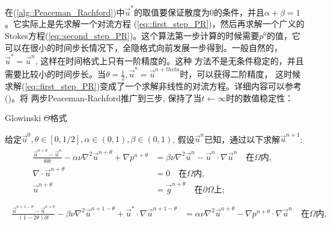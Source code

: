          在(\ref{alg::Peaceman_Rachford})中$\vec{u}^*$的取值要保证散度为0的条件，并且$\alpha + \beta = 1$。它实际上是先求解一个对流方程
         (\ref{eq::first_step_PR})，然后再求解一个广义的Stokes方程(\ref{eq::second_step_PR})。这个算法第一步计算的时候需要$p^0$的值，它
         可以在很小的时间步长情况下，全隐格式向前发展一步得到。一般自然的，$\vec{u}^* = \vec{u}^n$, 这样在时间格式上只有一阶精度的。这种
         方法不是无条件稳定的，并且需要比较小的时间步长。当$\theta = \frac{1}{2}, \vec{u}^* = \vec{u}^{n + theta}$时，可以获得二阶精度，
         这时候求解(\ref{eq::first_step_PR})变成了一个求解非线性的对流方程。详细内容可以参考(\cite{silvester1996fast})。\cite{dean1993some}将
         两步Peaceman-Rachford推广到三步, 保持了当$t \leftarrow \infty$时的数值稳定性：
         \begin{algorithm}
             \caption{Glowinski $\Theta$格式}
            \begin{algorithmic}[1]
                给定$\vec{u}^0, \theta \in [0, 1/2], \alpha \in (0, 1), \beta \in (0, 1)$, 假设$\vec{u}^n$已知，通过以下求解$\vec{u}^{n + 1}$:
                \begin{eqnarray}
                    \begin{aligned}
                        \frac{\vec{u}^{n + \theta} - \vec{u}^n}{\theta \delta t} - \alpha \nu \nabla^2\vec{u}^{n + \theta} +
                        \nabla p^{n + \theta}
                        & = \beta \nu \nabla^2\vec{u}^n - \vec{u}^n \cdot \nabla\vec{u}^{n} \quad \mbox {在} \Omega \mbox{内},& \\
                        \nabla \cdot \vec{u}^{n + \theta} & =  0 \quad \mbox{在} \Omega \mbox{内},&\\
                        \vec{u}^{n + \theta} & = \vec{g}^{n + \theta} \quad \mbox{在} \partial \Omega \mbox{上};& \\
                    \end{aligned}
                    \label{eq::first_step_GL_theta}
                \end{eqnarray}
                \begin{eqnarray}
                    \begin{aligned}
                        \frac{\vec{u}^{n + 1 - \theta} - \vec{u}^{n + \theta}}{(1 - 2\theta) \delta t} - \beta \nu \nabla^2\vec{u}^{n + 1 - \theta} + \vec{u}^* \cdot \nabla \vec{u}^{n + 1 -\theta}
                        & = \alpha \nu \nabla^2\vec{u}^{n + \theta}- \nabla p^{n + \theta} \cdot \nabla\vec{u}^{n} \quad \mbox {在} \Omega \mbox{内},& \\

\end{aligned}
\end{eqnarray}
\end{algorithmic}
\end{algorithm}
